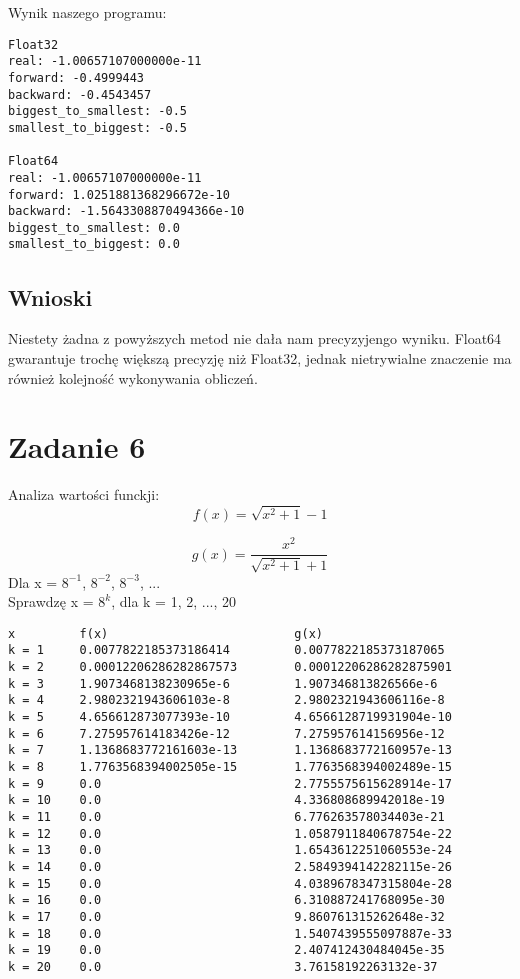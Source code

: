 \documentclass{article}
\begin{document}
\noindent Wynik naszego programu:
\begin{verbatim}
Float32
real: -1.00657107000000e-11
forward: -0.4999443
backward: -0.4543457
biggest_to_smallest: -0.5
smallest_to_biggest: -0.5

Float64
real: -1.00657107000000e-11
forward: 1.0251881368296672e-10
backward: -1.5643308870494366e-10
biggest_to_smallest: 0.0
smallest_to_biggest: 0.0
\end{verbatim}

\subsection*{Wnioski} Niestety żadna z powyższych metod nie dała nam precyzyjengo wyniku. Float64 gwarantuje trochę większą precyzję niż Float32, jednak nietrywialne znaczenie ma również kolejność wykonywania obliczeń.

\section{Zadanie 6}
Analiza wartości funckji:\\
\[
f(x) = \sqrt{x^2 + 1} - 1
\]

\[
g(x) = \frac{x^2}{\sqrt{x^2 + 1} + 1}
\]
Dla x = $8^{-1}$, $8^{-2}$, $8^{-3}$, ...\\
Sprawdzę x = $8^{k}$, dla k = {1, 2, ..., 20}

\begin{verbatim}
x         f(x)                          g(x)
k = 1     0.0077822185373186414         0.0077822185373187065
k = 2     0.00012206286282867573        0.00012206286282875901
k = 3     1.9073468138230965e-6         1.907346813826566e-6
k = 4     2.9802321943606103e-8         2.9802321943606116e-8
k = 5     4.656612873077393e-10         4.6566128719931904e-10
k = 6     7.275957614183426e-12         7.275957614156956e-12
k = 7     1.1368683772161603e-13        1.1368683772160957e-13
k = 8     1.7763568394002505e-15        1.7763568394002489e-15
k = 9     0.0                           2.7755575615628914e-17
k = 10    0.0                           4.336808689942018e-19
k = 11    0.0                           6.776263578034403e-21
k = 12    0.0                           1.0587911840678754e-22
k = 13    0.0                           1.6543612251060553e-24
k = 14    0.0                           2.5849394142282115e-26
k = 15    0.0                           4.0389678347315804e-28
k = 16    0.0                           6.310887241768095e-30
k = 17    0.0                           9.860761315262648e-32
k = 18    0.0                           1.5407439555097887e-33
k = 19    0.0                           2.407412430484045e-35
k = 20    0.0                           3.76158192263132e-37
\end{verbatim}
\end{document}
